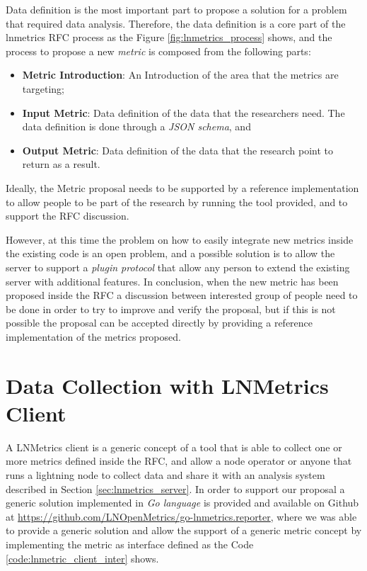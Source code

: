 Data definition is the most important part to propose a solution for a problem 
that required data analysis. Therefore, the data definition is a core 
part of the lnmetrics RFC process as the Figure \ref{fig:lnmetrics_process}
shows, and the process to propose a new \emph{metric} is composed from 
the following parts:

\begin{itemize}
    \item {\bf Metric Introduction}: An Introduction of the area that the metrics are targeting;
    \item {\bf Input Metric}: Data definition of the data that the researchers need. The data definition is done through a \emph{JSON schema}, and
    \item {\bf Output Metric}: Data definition of the data that the research point to return as a result. 
\end{itemize}

Ideally, the Metric proposal needs to be supported by a reference implementation to 
allow people to be part of the research by running the tool provided, and 
to support the RFC discussion.

However, at this time the problem on how to easily integrate new metrics inside the 
existing code is an open problem, and a possible solution is to allow the server 
to support a \emph{plugin protocol} that allow any person to extend the existing 
server with additional features.
In conclusion, when the new metric has been proposed inside the RFC a discussion between interested 
group of people need to be done in order to try to improve and verify the proposal, but if this is not possible
the proposal can be accepted directly by providing a reference implementation of the metrics proposed.

\section{Data Collection with LNMetrics Client}
\label{sec:lnmetrics_client}

A LNMetrics client is a generic concept of a tool that is able to collect one or more metrics 
defined inside the RFC, and allow a node operator or anyone that runs a lightning node
to collect data and share it with an analysis system described in Section \ref{sec:lnmetrics_server}.
In order to support our proposal a generic solution implemented in \emph{Go language} is provided 
and available on Github at \url{https://github.com/LNOpenMetrics/go-lnmetrics.reporter}, where we was able 
to provide a generic solution and allow the support of a generic metric concept 
by implementing the metric as interface defined as the Code \ref{code:lnmetric_client_inter} shows.

